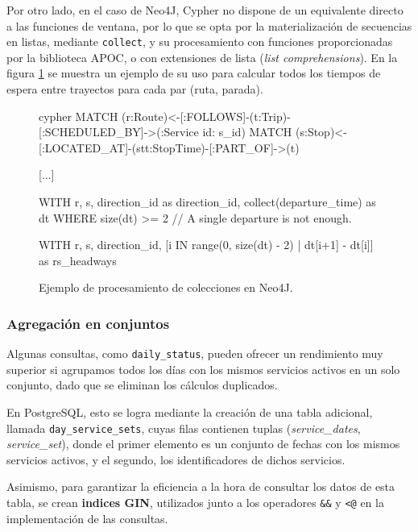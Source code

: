 Por otro lado, en el caso de Neo4J, Cypher\cite{cypher} no dispone de un equivalente directo a las funciones de ventana, por lo que se opta por la materialización de secuencias en listas, mediante \texttt{collect}, y su procesamiento con funciones proporcionadas por la biblioteca APOC\cite{apoc}, o con extensiones de lista (\textit{list comprehensions}). En la figura \ref{design:collect} se muestra un ejemplo de su uso para calcular todos los tiempos de espera entre trayectos para cada par (ruta, parada).

\begin{figure}[ht]
    \centering
    \vspace{0.2cm}
    \begin{huggedminted}{cypher}
MATCH (r:Route)<-[:FOLLOWS]-(t:Trip)-[:SCHEDULED_BY]->(:Service {id: s_id})
MATCH (s:Stop)<-[:LOCATED_AT]-(stt:StopTime)-[:PART_OF]->(t)

[...]

WITH r, s, direction_id as direction_id, collect(departure_time) as dt
WHERE size(dt) >= 2     // A single departure is not enough.

WITH r, s, direction_id,
     [i IN range(0, size(dt) - 2) | dt[i+1] - dt[i]] as rs_headways
    \end{huggedminted}
    \caption{Ejemplo de procesamiento de colecciones en Neo4J.}
    \label{design:collect}
\end{figure}

\subsubsection{Agregación en conjuntos}

Algunas consultas, como \texttt{daily\_status}, pueden ofrecer un rendimiento muy superior si agrupamos todos los días con los mismos servicios activos en un solo conjunto, dado que se eliminan los cálculos duplicados.

En PostgreSQL, esto se logra mediante la creación de una tabla adicional, llamada \texttt{day\_service\_sets}, cuyas filas contienen tuplas (\textit{service\_dates}, \textit{service\_set}), donde el primer elemento es un conjunto de fechas con los mismos servicios activos, y el segundo, los identificadores de dichos servicios.

Asimismo, para garantizar la eficiencia a la hora de consultar los datos de esta tabla, se crean \textbf{indices GIN}, utilizados junto a los operadores \texttt{\&\&} y \texttt{<@} en la implementación de las consultas.

